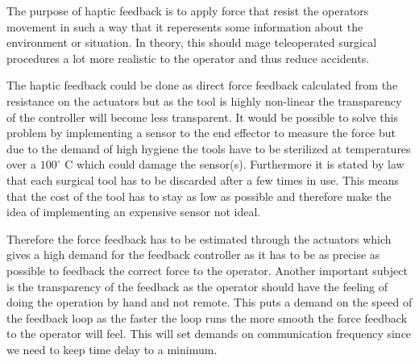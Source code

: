 \documentclass[conference]{IEEEtran}
\begin{document}
The purpose of haptic feedback is to apply force that resist the operators movement in such a way that it reperesents some information about the environment or situation.
In theory, this should mage teleoperated surgical procedures a lot more realistic to the operator and thus reduce accidents.



The haptic feedback could be done as direct force feedback calculated from the resistance on the actuators but as the tool is highly non-linear the transparency of the controller will become less transparent.
It would be possible to solve this problem by implementing a sensor to the end effector to measure the force but due to the demand of high hygiene the tools have to be sterilized at temperatures over a $100^\circ$ C which could damage the sensor(s). Furthermore it is stated by law that each surgical tool has to be discarded after a few times in use. This means that the cost of the tool has to stay as low as possible and therefore make the idea of implementing an expensive sensor not ideal.


Therefore the force feedback has to be estimated through the actuators which gives a high demand for the feedback controller as it has to be as precise as possible to feedback the correct force to the operator. Another important subject is the transparency of the feedback as the operator should have the feeling of doing the operation by hand and not remote. This puts a demand on the speed of the feedback loop as the faster the loop runs the more smooth the force feedback to the operator will feel. This will set demands on communication frequency since we need to keep time delay to a minimum.
\end{document}
